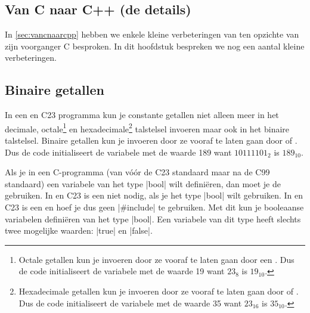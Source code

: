 
\begin{cpplstShortInline}
\chapter{Van C naar C++ (de details)}
\label{sec:vancnaarcppdedetails}
In \cref{sec:vancnaarcpp} hebben we enkele kleine verbeteringen van \Cpp{} ten opzichte van zijn voorganger C besproken.
In dit hoofdstuk bespreken we nog een aantal kleine verbeteringen.

\section{Binaire getallen}
\label{sec:binairegetallen}
In een \Cpp{} en C23 \cite{ISO2023C} programma kun je constante getallen niet alleen meer in het decimale, octale\footnote{%
	Octale getallen kun je invoeren door ze vooraf te laten gaan door een . Dus de code  initialiseert de variabele  met de waarde 19 want $23_8$ is $19_{10}$.  
} en hexadecimale\footnote{%
	Hexadecimale getallen kun je invoeren door ze vooraf te laten gaan door  of . Dus de code  initialiseert de variabele  met de waarde 35 want $23_{16}$ is $35_{10}$.  
} talstelsel invoeren maar ook in het binaire talstelsel.
Binaire getallen kun je invoeren door ze vooraf te laten gaan door  of . 
Dus de code  initialiseert de variabele  met de waarde 189 want $10111101_2$ is $189_{10}$.

Als je in een C-programma (van vóór de C23 standaard maar na de C99 standaard) een variabele van het type |bool| wilt definiëren, dan moet je de   gebruiken.
In \Cpp{} en C23 \cite{ISO2023C} is een  niet nodig, als je het type |bool| wilt gebruiken.
In \Cpp{} en C23 is  een  en hoef je dus geen |#include| te gebruiken.
Met dit  kun je booleaanse variabelen definiëren van het type |bool|.
Een variabele van dit type heeft slechts twee mogelijke waarden: |true| en |false|.


\end{cpplstShortInline}
